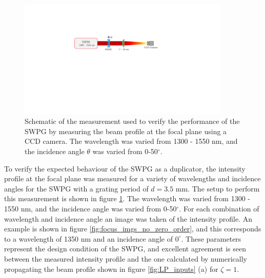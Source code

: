 \begin{figure}
	\centering
	\includegraphics[width=0.9\textwidth]{figures/Two_source/SWPG_focus_measurement.pdf}
	\caption[Schematic of the measurement used to verify the performance of the SWPG]{Schematic of the measurement used to verify the performance of the SWPG by measuring the beam profile at the focal plane using a CCD camera.  The wavelength was varied from 1300 - 1550 nm, and the incidence angle $\theta$ was varied from 0-50$^{\circ}$.}
	\label{fig:focus_img_schematic}
\end{figure}

To verify the expected behaviour of the SWPG as a duplicator, the intensity profile at the focal plane was measured for a variety of wavelengths and incidence angles for the SWPG with a grating period of $d=3.5$ mm.  The setup to perform this measurement is shown in figure \ref{fig:focus_img_schematic}. The wavelength was varied from 1300 - 1550 nm, and the incidence angle was varied from 0-50$^{\circ}$.  For each combination of wavelength and incidence angle an image was taken of the intensity profile.  An example is shown in figure \ref{fig:focus_imgs_no_zero_order}, and this corresponds to a wavelength of 1350 nm and an incidence angle of $0^{\circ}$.  These parameters represent the design condition of the SWPG, and excellent agreement is seen between the measured intensity profile and the one calculated by numerically propagating the beam profile shown in figure \ref{fig:LP_inputs} (a) for $\zeta=1$.  

